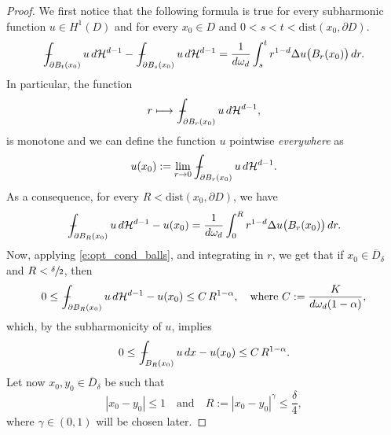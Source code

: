 \documentclass[11pt]{article}
\numberwithin{equation}{section}
\def\mto{\mathchoice{\longmapsto}{\mapsto}{\mapsto}{\mapsto}}
\theoremstyle{plain}
\theoremstyle{definition}
\def\HH{\mathcal{H}}
\newcommand{\mean}[1]{\,-\hskip-1.08em\int_{#1}}
\begin{document}
\begin{proof}
We first notice that the following formula is true for every subharmonic function $u\in H^1(D)$ and for every $x_0\in D$ and $0<s<t<\text{dist}(x_0,\partial D)$.
\[\mean{\partial B_t(x_0)}{u\,d\HH^{d-1}}-\mean{\partial B_s(x_0)}{u\,d\HH^{d-1}}=\frac{1}{d\omega_d}\int_s^t r^{1-d}\Delta u\big(B_r(x_0)\big)\,dr.\]
In particular, the function
\[r\mto \mean{\partial B_r(x_0)}{u\,d\HH^{d-1}},\]
is monotone and we can define the function $u$ pointwise {\it everywhere} as
\[u(x_0):=\lim_{r\to0}\mean{\partial B_r(x_0)}{u\,d\HH^{d-1}}.\]
As a consequence, for every $R<\text{dist}(x_0,\partial D)$, we have
\[\mean{\partial B_R(x_0)}{u\,d\HH^{d-1}}-u(x_0)=\frac{1}{d\omega_d}\int_0^R r^{1-d}\Delta u\big(B_r(x_0)\big)\,dr.\]
Now, applying \eqref{e:opt_cond_balls}, and integrating in $r$, we get that if $x_0\in \overline D_\delta$ and $R<\sfrac\delta2$, then
\begin{equation}%
0\le \mean{\partial B_R(x_0)}{u\,d\HH^{d-1}}-u(x_0)\le C\,R^{1-\alpha},\quad\text{where } C:=\frac{K}{d\omega_d(1-\alpha)},
\end{equation}
which, by the subharmonicity of $u$, implies
\begin{equation}\label{e:mean_continuity2}
0\le \mean{B_R(x_0)}{u\,dx}-u(x_0)\le C\,R^{1-\alpha}.
\end{equation}
Let now $x_0,y_0\in \overline D_\delta$ be such that
\[|x_0-y_0|\le 1\quad\text{and}\quad R:=|x_0-y_0|^{\gamma}\le \frac\delta4,\]
where $\gamma\in(0,1)$ will be chosen later.


\end{proof}
\end{document}
